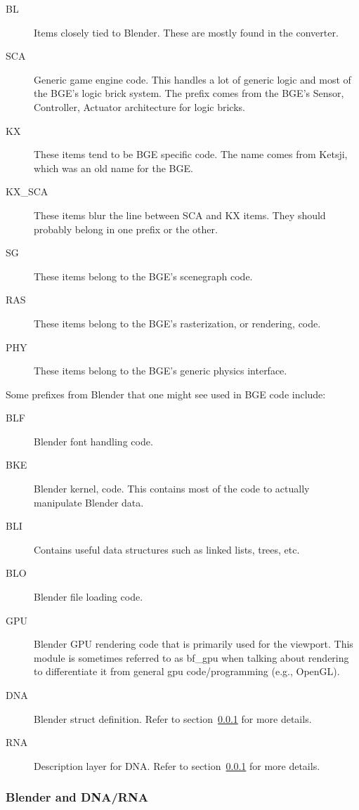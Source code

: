 \begin{description}
 \item[BL] Items closely tied to Blender. These are mostly found in the converter.
 \item[SCA] Generic game engine code. This handles a lot of generic logic and most of the BGE's logic brick system. The prefix comes from the BGE's Sensor, Controller, Actuator architecture for logic bricks.
 \item [KX] These items tend to be BGE specific code. The name comes from Ketsji, which was an old name for the BGE.
 \item [KX\_SCA] These items blur the line between SCA and KX items. They should probably belong in one prefix or the other.
 \item [SG] These items belong to the BGE's scenegraph code.
 \item [RAS] These items belong to the BGE's rasterization, or rendering, code.
 \item [PHY] These items belong to the BGE's generic physics interface.
\end{description}

Some prefixes from Blender that one might see used in BGE code include:

\begin{description}
 \item [BLF] Blender font handling code.
 \item [BKE] Blender kernel, code. This contains most of the code to actually manipulate Blender data.
 \item [BLI] Contains useful data structures such as linked lists, trees, etc.
 \item [BLO] Blender file loading code.
 \item [GPU] Blender GPU rendering code that is primarily used for the viewport. This module is sometimes referred to as bf\_gpu when talking about rendering to differentiate it from general gpu code/programming (e.g., OpenGL).
 \item [DNA] Blender struct definition. Refer to section~\ref{sec:bf_dna_rna} for more details.
 \item [RNA] Description layer for DNA. Refer to section~\ref{sec:bf_dna_rna} for more details.
\end{description}

\subsubsection{Blender and DNA/RNA}
\label{sec:bf_dna_rna}

